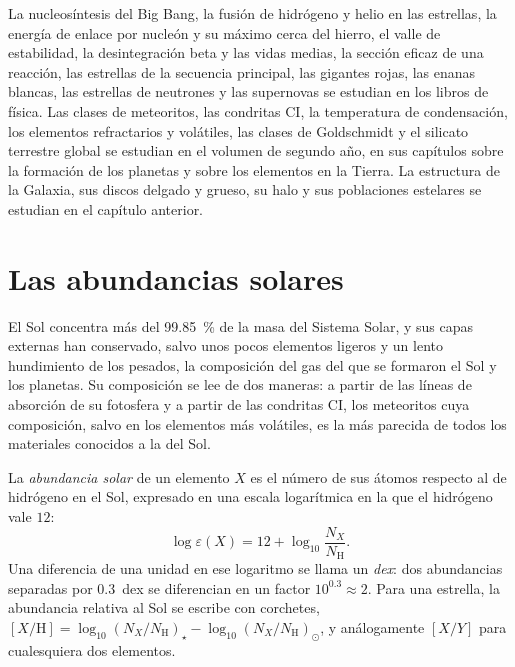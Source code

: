 \begin{recall}
La nucleosíntesis del Big Bang, la fusión de hidrógeno y helio en las estrellas,
la energía de enlace por nucleón y su máximo cerca del hierro, el valle de
estabilidad, la desintegración beta y las vidas medias, la sección eficaz de una reacción,
las estrellas de la secuencia principal, las gigantes rojas, las enanas blancas, las estrellas de neutrones y las
supernovas se estudian en los libros de física. Las clases de meteoritos, las condritas CI,
la temperatura de condensación, los elementos refractarios y volátiles,
las clases de Goldschmidt y el silicato terrestre global se estudian en el
volumen de segundo año, en sus capítulos sobre la formación de los planetas y sobre
los elementos en la Tierra. La estructura de la Galaxia, sus discos delgado y grueso,
su halo y sus poblaciones estelares se estudian en el
capítulo anterior.
\end{recall}

\section{Las abundancias solares}\label{sec:b3:origin-of-elements:solar}

El Sol concentra más del \qty{99.85}{\percent} de la masa del Sistema
Solar, y sus capas externas han conservado, salvo unos pocos elementos ligeros
y un lento hundimiento de los pesados, la composición del gas del que
se formaron el Sol y los planetas. Su composición se lee de dos maneras:
a partir de las líneas de absorción de su fotosfera y a partir de las condritas CI,
los meteoritos cuya composición, salvo en los elementos más volátiles,
es la más parecida de todos los materiales conocidos a la del Sol.

\begin{definition}\label{def:b3:origin-of-elements:abundance}
La \emph{abundancia solar} de un elemento $X$ es
el número de sus átomos respecto al de hidrógeno en el Sol,
expresado en una escala logarítmica en la que el hidrógeno vale $12$:
\[
\log\varepsilon(X) = 12 + \log_{10}\frac{N_X}{N_\mathrm{H}} .
\]
Una diferencia de una unidad en ese logaritmo se llama un
\emph{dex}: dos abundancias separadas por $0.3$~dex se diferencian en un
factor $10^{0.3} \approx 2$. Para una estrella, la abundancia relativa al
Sol se escribe con corchetes,
$[X/\mathrm{H}] = \log_{10}(N_X/N_\mathrm{H})_\star -
\log_{10}(N_X/N_\mathrm{H})_\odot$, y análogamente $[X/Y]$ para cualesquiera dos
elementos.
\end{definition}

